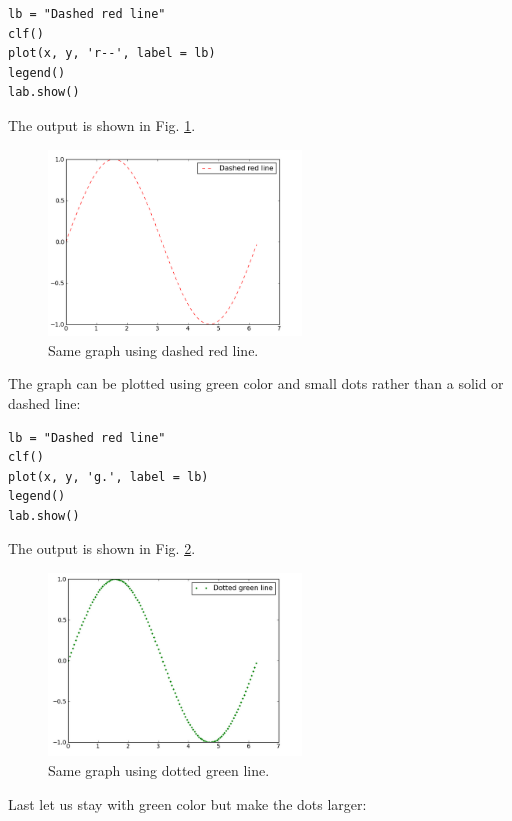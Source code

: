 \documentclass[article,A4,12pt]{llncs}
\begin{document}
\begin{verbatim}
lb = "Dashed red line"
clf()
plot(x, y, 'r--', label = lb)
legend()
lab.show()
\end{verbatim}
The output is shown in Fig. \ref{fig:plot3}.



\begin{figure}[!ht]
\begin{center}
\includegraphics[width=0.6\textwidth]{img/plot3.png}
\end{center}
\vspace{-2mm}
\caption{Same graph using dashed red line.}
\label{fig:plot3}
\end{figure}
\noindent
The graph can be plotted using green color and small dots rather than 
a solid or dashed line:

\begin{verbatim}
lb = "Dashed red line"
clf()
plot(x, y, 'g.', label = lb)
legend()
lab.show()
\end{verbatim}
The output is shown in Fig. \ref{fig:plot4}.

\newpage

\begin{figure}[!ht]
\begin{center}
\includegraphics[width=0.6\textwidth]{img/plot4.png}
\end{center}
\vspace{-6mm}
\caption{Same graph using dotted green line.}
\label{fig:plot4}
\vspace{-5mm}
\end{figure}
\noindent
\newpage
\noindent
Last let us stay with green color but make the dots larger:
\end{document}
